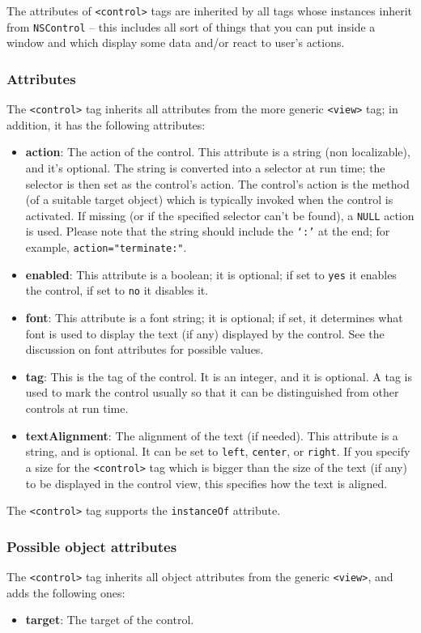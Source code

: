 The attributes of \texttt{<control>} tags are inherited by all tags
whose instances inherit from \texttt{NSControl} -- this includes all
sort of things that you can put inside a window and which display some
data and/or react to user's actions.

\subsubsection{Attributes}
The \texttt{<control>} tag inherits all attributes from the more
generic \texttt{<view>} tag; in addition, it has the following
attributes:
\begin{itemize}
\item {\bf action}: The action of the control.  This attribute is a
  string (non localizable), and it's optional.  The string is
  converted into a selector at run time; the selector is then set as
  the control's action.  The control's action is the method (of a
  suitable target object) which is typically invoked when the control
  is activated.  If missing (or if the specified selector can't be
  found), a \texttt{NULL} action is used.  Please note that the string
  should include the \texttt{`:'} at the end; for example,
  \texttt{action="terminate:"}.
\item {\bf enabled}: This attribute is a boolean; it is optional; if
  set to \texttt{yes} it enables the control, if set to \texttt{no} it
  disables it.
\item {\bf font}: This attribute is a font string; it is optional; if
  set, it determines what font is used to display the text (if any)
  displayed by the control.  See the discussion on font attributes for
  possible values.
\item {\bf tag}: This is the tag of the control.  It is an integer,
  and it is optional.  A tag is used to mark the control usually so
  that it can be distinguished from other controls at run time.
\item {\bf textAlignment}: The alignment of the text (if needed).
  This attribute is a string, and is optional.  It can be set to
  \texttt{left}, \texttt{center}, or \texttt{right}.  If you specify a
  size for the \texttt{<control>} tag which is bigger than the size of
  the text (if any) to be displayed in the control view, this
  specifies how the text is aligned.
\end{itemize}

The \texttt{<control>} tag supports the \texttt{instanceOf} attribute.

\subsubsection{Possible object attributes}
The \texttt{<control>} tag inherits all object attributes from the
generic \texttt{<view>}, and adds the following ones:
\begin{itemize}
\item {\bf target}: The target of the control.
\end{itemize}


